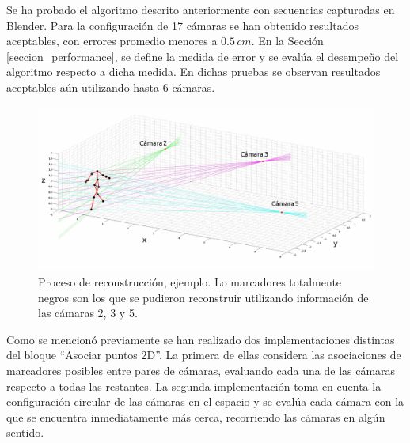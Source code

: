 Se ha probado el algoritmo descrito anteriormente con secuencias capturadas en Blender. Para la configuración de 17 cámaras se han obtenido resultados aceptables,  con errores promedio menores a $0.5\,cm$. En la Sección \ref{seccion_performance}, se define la medida de error  y se evalúa el desempeño del algoritmo respecto a dicha medida. En dichas pruebas se observan resultados aceptables aún utilizando hasta 6 cámaras.

\begin{figure}[h!]
\centering
\captionsetup{justification=centering,margin=0.8cm}
\includegraphics[scale=0.5]{img/Reconstruccion/Reconstruccion_3_camaras2.jpg}
\caption{Proceso de reconstrucción, ejemplo. Lo marcadores totalmente negros son los que se pudieron reconstruir utilizando información de las cámaras 2, 3 y 5.}
\end{figure}


Como se mencionó previamente se han realizado dos implementaciones distintas del bloque  “Asociar puntos 2D”. La primera de ellas considera las asociaciones de marcadores posibles entre pares de cámaras, evaluando cada una de las cámaras respecto a todas las restantes.  La segunda implementación toma en cuenta  la configuración circular de las cámaras en el espacio y se evalúa cada cámara con la que se encuentra inmediatamente más cerca,  recorriendo las cámaras en algún sentido.

